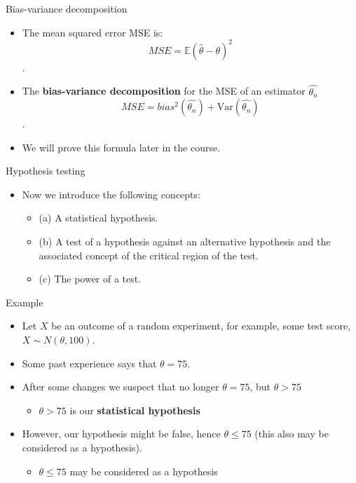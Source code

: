 \documentclass{beamer}
\begin{document}
\begin{frame}
{\centerline{Bias-variance decomposition}}


\begin{itemize}
\item  The mean squared error MSE is:
 $$MSE = \mathbb{E}(\hat{\theta} - \theta)^2$$. 

\item The \textbf{bias-variance decomposition} for the MSE of an estimator $\hat{\theta_n}$
$$MSE = bias^2(\hat{\theta_n}) + \text{Var}(\hat{\theta_n})$$.

\item We will prove this formula later in the course.
\end{itemize}

\end{frame}


\begin{frame}
{\centerline{Hypothesis testing}}

\begin{itemize}
\item Now we introduce the following concepts:

\begin{itemize}
\item (a) A statistical hypothesis.
\item (b) A test of a hypothesis against an alternative hypothesis and the associated concept of the critical region of the test.
\item (c) The power of a test.
\end{itemize}
\end{itemize}

\end{frame}


\begin{frame}
{\centerline{Example}}

\begin{itemize}
\item Let $X$ be an outcome of a random experiment, for example, some test score, $X \sim N(\theta, 100)$.
\item Some past experience says that $\theta=75$.
\item After some changes we suspect that no longer $\theta=75$, but $\theta>75$
\begin{itemize}
\item  $\theta>75$ is our \textbf{statistical hypothesis}
\end{itemize}
\item However, our hypothesis might be false, hence $\theta \leq 75$ (this also may be considered as a hypothesis). 
\begin{itemize}
\item $\theta \leq 75$  may be considered as a hypothesis
\end{itemize}

\end{itemize}




\end{frame}
\end{document}
